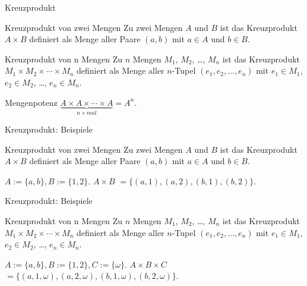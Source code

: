\begin{frame}{Kreuzprodukt}
	\begin{block}{Kreuzprodukt von zwei Mengen}
	Zu zwei Mengen $A$ und $B$ ist das Kreuzprodukt $A \times B$ definiert als Menge aller Paare $(a, b)$ mit $a \in A$ und $b \in B$.
	\end{block}
	
	\begin{block}{Kreuzprodukt von n Mengen}
		Zu $n$ Mengen $M_1$, $M_2$, \dots, $M_n$ \pause ist das Kreuzprodukt $M_1 \times M_2 \times \cdots \times M_n$ \pause definiert als Menge aller $n$-Tupel $(e_1, e_2, \dots, e_n)$ \pause mit $e_1 \in M_1$, $e_2 \in M_2$, \dots, $e_n \in M_n$.
	\end{block}\pause
	
	\begin{block}{Mengenpotenz}
		$\underbrace{A \times A \times \cdots \times A}_{n \times mal} = A^n$.
	\end{block}
\end{frame}

\begin{frame}{Kreuzprodukt: Beispiele}
	\begin{block}{Kreuzprodukt von zwei Mengen}
		Zu zwei Mengen $A$ und $B$ ist das Kreuzprodukt $A \times B$ definiert als Menge aller Paare $(a, b)$ mit $a \in A$ und $b \in B$.
	\end{block}
	\pause
	
	$A := \{a, b\}, B := \{1, 2\}$. \pause $A \times B$ \pause $ = \{(a, 1), (a, 2), (b, 1), (b, 2)\}$.
\end{frame}

\begin{frame}{Kreuzprodukt: Beispiele}
	
	\begin{block}{Kreuzprodukt von n Mengen}
		Zu $n$ Mengen $M_1$, $M_2$, \dots, $M_n$ \pause ist das Kreuzprodukt $M_1 \times M_2 \times \cdots \times M_n$ \pause definiert als Menge aller $n$-Tupel $(e_1, e_2, \dots, e_n)$ \pause mit $e_1 \in M_1$, $e_2 \in M_2$, \dots, $e_n \in M_n$.
	\end{block}\pause
	
	$A := \{a, b\}, B := \{1, 2\}, C:= \{\omega\}$. $A \times B \times C$ \pause $ = \{(a, 1, \omega), (a, 2, \omega), (b, 1, \omega), (b, 2, \omega) \}$.
	
\end{frame}

